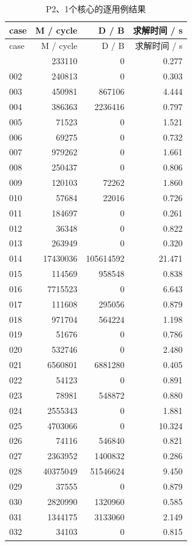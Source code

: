 \documentclass[anonymous,notoc]{gmcm2026}
\begin{document}
\begin{longtable}{lrrr}
\caption{P2、1个核心的逐用例结果}\\
\toprule
case & M / cycle & D / B & 求解时间 / s\\\midrule
\endfirsthead
\toprule
case & M / cycle & D / B & 求解时间 / s\\\midrule
\endhead
\bottomrule\endfoot
001 & 233110 & 0 & 0.277 \\
002 & 240813 & 0 & 0.303 \\
003 & 450981 & 867106 & 4.444 \\
004 & 386363 & 2236416 & 0.797 \\
005 & 71523 & 0 & 1.521 \\
006 & 69275 & 0 & 0.732 \\
007 & 979262 & 0 & 1.661 \\
008 & 250437 & 0 & 0.806 \\
009 & 120103 & 72262 & 1.860 \\
010 & 57684 & 22016 & 0.726 \\
011 & 184697 & 0 & 0.261 \\
012 & 36348 & 0 & 0.822 \\
013 & 263949 & 0 & 0.320 \\
014 & 17430036 & 105614592 & 21.471 \\
015 & 114569 & 958548 & 0.838 \\
016 & 7715523 & 0 & 6.643 \\
017 & 111608 & 295056 & 0.879 \\
018 & 971704 & 564224 & 1.198 \\
019 & 51676 & 0 & 0.786 \\
020 & 532746 & 0 & 2.480 \\
021 & 6560801 & 6881280 & 0.405 \\
022 & 54123 & 0 & 0.891 \\
023 & 78981 & 548872 & 0.880 \\
024 & 2555343 & 0 & 1.881 \\
025 & 4703066 & 0 & 10.324 \\
026 & 74116 & 546840 & 0.821 \\
027 & 2363952 & 1400832 & 0.286 \\
028 & 40375049 & 51546624 & 9.450 \\
029 & 37555 & 0 & 0.879 \\
030 & 2820990 & 1320960 & 0.585 \\
031 & 1344175 & 3133060 & 2.149 \\
032 & 34103 & 0 & 0.815 \\

\end{longtable}
\end{document}
